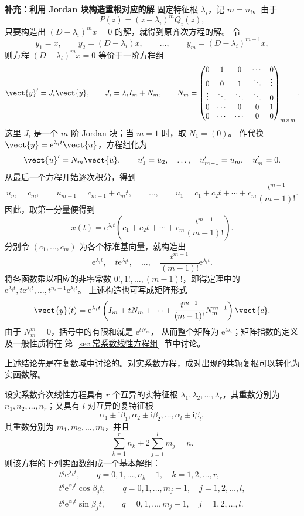 \noindent\textbf{补充：利用 Jordan 块构造重根对应的解}\quad
固定特征根 $\lambda_i$，记 $m=n_i$。由于
\[
	P(z)=(z-\lambda_i)^mQ_i(z),
\]
只要构造出 $(D-\lambda_i)^mx=0$ 的解，就得到原齐次方程的解。
令
\[
	y_1=x,\qquad y_2=(D-\lambda_i)x,\qquad\ldots,\qquad
	y_m=(D-\lambda_i)^{m-1}x,
\]
则方程 $(D-\lambda_i)^mx=0$ 等价于一阶方程组
\[
	\vect{y}'=J_i\vect{y},\qquad
	J_i=\lambda_iI_m+N_m,\qquad
	N_m=
	\begin{pmatrix}
		0&1&0&\cdots&0\\
		0&0&1&\ddots&\vdots\\
		\vdots&\ddots&\ddots&\ddots&0\\
		0&\cdots&0&0&1\\
		0&\cdots&\cdots&0&0
	\end{pmatrix}_{m\times m}.
\]
这里 $J_i$ 是一个 $m$ 阶 Jordan 块；当 $m=1$ 时，取 $N_1=(0)$。
作代换 $\vect{y}=\mathrm{e}^{\lambda_it}\vect{u}$，方程组化为
\[
	\vect{u}'=N_m\vect{u},
	\qquad
	u_1'=u_2,\quad\ldots,\quad u_{m-1}'=u_m,\quad u_m'=0.
\]
从最后一个方程开始逐次积分，得到
\[
	u_m=c_m,\qquad u_{m-1}=c_{m-1}+c_mt,\qquad\ldots,\qquad
	u_1=c_1+c_2t+\cdots+c_m\dfrac{t^{m-1}}{(m-1)!}.
\]
因此，取第一分量便得到
\[
	x(t)=\mathrm{e}^{\lambda_it}
	\left(c_1+c_2t+\cdots+c_m\dfrac{t^{m-1}}{(m-1)!}\right).
\]
分别令 $(c_1,\ldots,c_m)$ 为各个标准基向量，就构造出
\[
	\mathrm{e}^{\lambda_it},\quad
	t\mathrm{e}^{\lambda_it},\quad\ldots,\quad
	\dfrac{t^{m-1}}{(m-1)!}\mathrm{e}^{\lambda_it}.
\]
将各函数乘以相应的非零常数 $0!,1!,\ldots,(m-1)!$，即得定理中的
$\mathrm{e}^{\lambda_it},t\mathrm{e}^{\lambda_it},\ldots,
t^{n_i-1}\mathrm{e}^{\lambda_it}$。
上述构造也可写成矩阵形式
\[
	\vect{y}(t)=\mathrm{e}^{\lambda_it}
	\left(I_m+tN_m+\cdots+\dfrac{t^{m-1}}{(m-1)!}N_m^{m-1}\right)\vect{c}.
\]
由于 $N_m^m=0$，括号中的有限和就是 $\mathrm{e}^{tN_m}$，
从而整个矩阵为 $\mathrm{e}^{tJ_i}$；矩阵指数的定义及一般性质将在
第~\ref{sec:常系数线性方程组}~节中讨论。

上述结论先是在复数域中讨论的。对实系数方程，成对出现的共轭复根可以转化为实函数解。

\begin{corollary}\label{cor:实系数常系数方程的基本解组}
	设实系数齐次线性方程具有 $r$ 个互异的实特征根
	$\lambda_1,\lambda_2,\ldots,\lambda_r$，其重数分别为
	$n_1,n_2,\ldots,n_r$；又具有 $l$ 对互异的复特征根
	\[
		\alpha_1\pm\mathrm{i}\beta_1,
		\alpha_2\pm\mathrm{i}\beta_2,
		\ldots,
		\alpha_l\pm\mathrm{i}\beta_l,
	\]
	其重数分别为 $m_1,m_2,\ldots,m_l$，并且
	\[
		\sum_{k=1}^{r}n_k+2\sum_{j=1}^{l}m_j=n.
	\]
	则该方程的下列实函数组成一个基本解组：
	\[
		\begin{gathered}
			t^q\mathrm{e}^{\lambda_kt},
			\qquad q=0,1,\ldots,n_k-1,
			\quad k=1,2,\ldots,r,\\
			t^q\mathrm{e}^{\alpha_jt}\cos\beta_jt,
			\qquad q=0,1,\ldots,m_j-1,
			\quad j=1,2,\ldots,l,\\
			t^q\mathrm{e}^{\alpha_jt}\sin\beta_jt,
			\qquad q=0,1,\ldots,m_j-1,
			\quad j=1,2,\ldots,l.
		\end{gathered}
	\]
\end{corollary}

